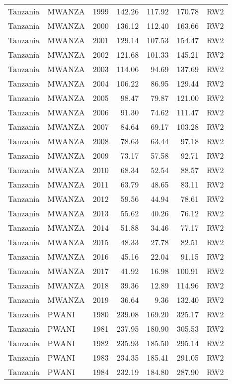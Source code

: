 \begin{longtable}{lllrrrl}
  Tanzania & MWANZA & 1999 & 142.26 & 117.92 & 170.78 & RW2 \\ 
  Tanzania & MWANZA & 2000 & 136.12 & 112.40 & 163.66 & RW2 \\ 
  Tanzania & MWANZA & 2001 & 129.14 & 107.53 & 154.47 & RW2 \\ 
  Tanzania & MWANZA & 2002 & 121.68 & 101.33 & 145.21 & RW2 \\ 
  Tanzania & MWANZA & 2003 & 114.06 & 94.69 & 137.69 & RW2 \\ 
  Tanzania & MWANZA & 2004 & 106.22 & 86.95 & 129.44 & RW2 \\ 
  Tanzania & MWANZA & 2005 & 98.47 & 79.87 & 121.00 & RW2 \\ 
  Tanzania & MWANZA & 2006 & 91.30 & 74.62 & 111.47 & RW2 \\ 
  Tanzania & MWANZA & 2007 & 84.64 & 69.17 & 103.28 & RW2 \\ 
  Tanzania & MWANZA & 2008 & 78.63 & 63.44 & 97.18 & RW2 \\ 
  Tanzania & MWANZA & 2009 & 73.17 & 57.58 & 92.71 & RW2 \\ 
  Tanzania & MWANZA & 2010 & 68.34 & 52.54 & 88.57 & RW2 \\ 
  Tanzania & MWANZA & 2011 & 63.79 & 48.65 & 83.11 & RW2 \\ 
  Tanzania & MWANZA & 2012 & 59.56 & 44.94 & 78.61 & RW2 \\ 
  Tanzania & MWANZA & 2013 & 55.62 & 40.26 & 76.12 & RW2 \\ 
  Tanzania & MWANZA & 2014 & 51.88 & 34.46 & 77.17 & RW2 \\ 
  Tanzania & MWANZA & 2015 & 48.33 & 27.78 & 82.51 & RW2 \\ 
  Tanzania & MWANZA & 2016 & 45.16 & 22.04 & 91.15 & RW2 \\ 
  Tanzania & MWANZA & 2017 & 41.92 & 16.98 & 100.91 & RW2 \\ 
  Tanzania & MWANZA & 2018 & 39.36 & 12.89 & 114.96 & RW2 \\ 
  Tanzania & MWANZA & 2019 & 36.64 & 9.36 & 132.40 & RW2 \\ 
  Tanzania & PWANI & 1980 & 239.08 & 169.20 & 325.17 & RW2 \\ 
  Tanzania & PWANI & 1981 & 237.95 & 180.90 & 305.53 & RW2 \\ 
  Tanzania & PWANI & 1982 & 235.93 & 185.50 & 295.14 & RW2 \\ 
  Tanzania & PWANI & 1983 & 234.35 & 185.41 & 291.05 & RW2 \\ 
  Tanzania & PWANI & 1984 & 232.19 & 184.80 & 287.90 & RW2 \\ 

\end{longtable}
